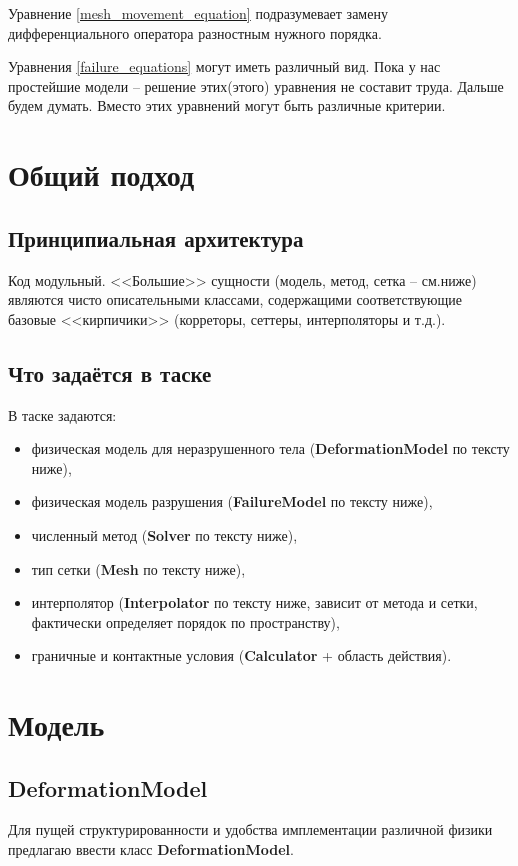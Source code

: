 \documentclass[a4paper,12pt]{article}
\numberwithin{equation}{section}
\begin{document}
	Уравнение \eqref{mesh_movement_equation} подразумевает замену дифференциального оператора разностным нужного порядка.
	
	Уравнения \eqref{failure_equations} могут иметь различный вид. Пока у нас простейшие модели -- решение этих(этого) уравнения не составит труда. Дальше будем думать.
	Вместо этих уравнений могут быть различные критерии.
	

\section{Общий подход}

\subsection{Принципиальная архитектура}

Код модульный. <<Большие>> сущности (модель, метод, сетка -- см.ниже) являются чисто описательными классами, содержащими соответствующие базовые <<кирпичики>> (корреторы, сеттеры, интерполяторы и т.д.).

\subsection{Что задаётся в таске}

В таске задаются:
	\begin{itemize}
		\item{физическая модель для неразрушенного тела (\textbf{DeformationModel} по тексту ниже),}
		\item{физическая модель разрушения (\textbf{FailureModel} по тексту ниже),}
		\item{численный метод (\textbf{Solver} по тексту ниже),}
		\item{тип сетки (\textbf{Mesh} по тексту ниже),}
		\item{интерполятор (\textbf{Interpolator} по тексту ниже, зависит от метода и сетки, фактически определяет порядок по пространству),}
		\item{граничные и контактные условия (\textbf{Calculator} + область действия).}
	\end{itemize}

\section{Модель}
\subsection{DeformationModel}
	Для пущей структурированности и удобства имплементации различной физики предлагаю ввести класс \textbf{DeformationModel}.
	
\end{document}
